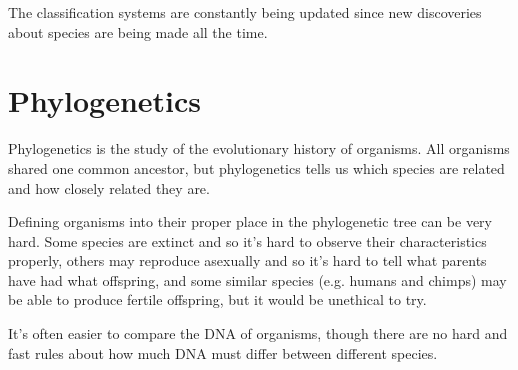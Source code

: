 \documentclass{article}
\begin{document}
The classification systems are constantly being updated since new discoveries
about species are being made all the time.

\section*{Phylogenetics}

Phylogenetics is the study of the evolutionary history of organisms. All
organisms shared one common ancestor, but phylogenetics tells us which species
are related and how closely related they are.

Defining organisms into their proper place in the phylogenetic tree can be very
hard. Some species are extinct and so it's hard to observe their characteristics
properly, others may reproduce asexually and so it's hard to tell what parents
have had what offspring, and some similar species (e.g. humans and chimps) may
be able to produce fertile offspring, but it would be unethical to try.

It's often easier to compare the DNA of organisms, though there are no hard and
fast rules about how much DNA must differ between different species.
\end{document}
